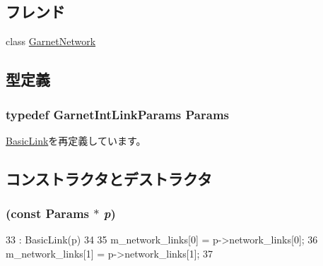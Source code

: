 \subsection*{フレンド}
\begin{DoxyCompactItemize}
\item 
class \hyperlink{classGarnetIntLink_a93e18c390666ec9c26269c22345e9e94}{GarnetNetwork}
\end{DoxyCompactItemize}


\subsection{型定義}
\hypertarget{classGarnetIntLink_ac67f1fad0686704820c88642f65ddcce}{
\subsubsection[{Params}]{\setlength{\rightskip}{0pt plus 5cm}typedef GarnetIntLinkParams {\bf Params}}}
\label{classGarnetIntLink_ac67f1fad0686704820c88642f65ddcce}


\hyperlink{classBasicLink_a2c371814143f1675a601e935bfbd756c}{BasicLink}を再定義しています。

\subsection{コンストラクタとデストラクタ}
\hypertarget{classGarnetIntLink_a3c3260a4e57f63aceb4cfbe087f1fcda}{
\subsubsection[{GarnetIntLink}]{ (const {\bf Params} $\ast$ {\em p})}}
\label{classGarnetIntLink_a3c3260a4e57f63aceb4cfbe087f1fcda}



\begin{DoxyCode}
33     : BasicLink(p)
34 {
35     m_network_links[0] = p->network_links[0];
36     m_network_links[1] = p->network_links[1];
37 }
\end{DoxyCode}


